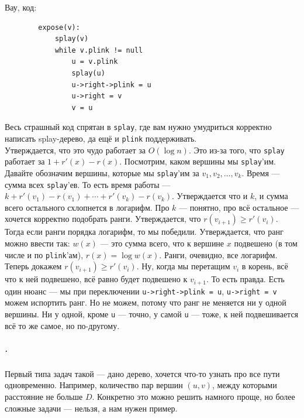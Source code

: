 \documentclass{article}
\newcommand{\pseudo}{PseudoLexer.py:PseudoLexer -x}
\newcommand{\pseudocode}[1]{\texttt{#1}}
\begin{document}
    Вау, код:
    \begin{verbatim}
        expose(v):
            splay(v)
            while v.plink != null
                u = v.plink
                splay(u)
                u->right->plink = u
                u->right = v
                v = u
    \end{verbatim}
    Весь страшный код спрятан в \pseudocode{splay}, где вам нужно умудриться корректно написать splay-дерево, да ещё и \pseudocode{plink} поддерживать.\\
    Утверждается, что это чудо работает за $O(\log n)$. Это из-за того, что \pseudocode{splay} работает за $1+r'(x)-r(x)$. Посмотрим, каком вершины мы \pseudocode{splay}'им. Давайте обозначим вершины, которые мы \pseudocode{splay}'им за $v_1,v_2,\ldots,v_k$. Время --- сумма всех \pseudocode{splay}'ев. То есть время работы --- $k+r'(v_1)-r(v_1)+\cdots+r'(v_k)-r(v_k)$. Утверждается что и $k$, и сумма всего остального схлопнется в логарифм. Про $k$ --- понятно, про всё остальное --- хочется корректно подобрать ранги. Утверждается, что $r(v_{i+1})\geqslant r'(v_i)$. Тогда если ранги порядка логарифм, то мы победили. Утверждается, что ранг можно ввести так: $w(x)$ --- это сумма всего, что к вершине $x$ подвешено (в том числе и по \pseudocode{plink}'ам), $r(x)=\log w(x)$. Ранги, очевидно, все логарифм. Теперь докажем $r(v_{i+1})\geqslant r'(v_i)$. Ну, когда мы перетащим $v_i$ в корень, всё что к ней подвешено, всё равно будет подвешено к $v_{i+1}$. То есть правда. Есть один нюанс --- мы при переключении \pseudocode{u->right->plink = u}, \pseudocode{u->right = v} можем испортить ранг. Но не можем, потому что ранг не меняется ни у одной вершины. Ни у одной, кроме \pseudocode{u} --- точно, у самой \pseudocode{u} --- тоже, к ней подвешивается всё то же самое, но по-другому.
    \subparagraph{.}
    Первый типа задач такой --- дано дерево, хочется что-то узнать про все пути одновременно. Например, количество пар вершин $(u,v)$, между которыми расстояние не больше $D$. Конкретно это можно решить намного проще, но более сложные задачи --- нельзя, а нам нужен пример.\\
\end{document}
